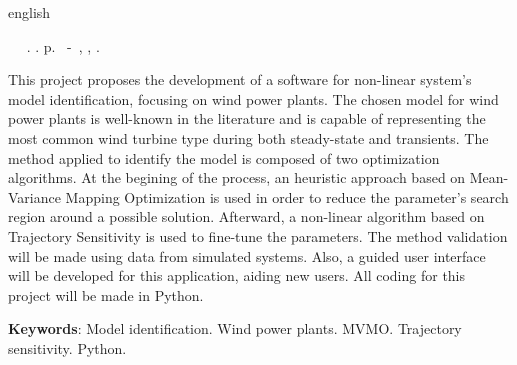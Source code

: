 \begin{resumo}[Abstract]

\begin{otherlanguage*}{english}

\begin{flushleft} 
	\setlength{\absparsep}{0pt} %
	\SingleSpacing 
 	\imprimirautorabr~ ~\textbf{\imprimirtitleabstract}.	\imprimirdata.  \pageref{LastPage}p. 
	\imprimirtipotrabalho~-~\imprimirinstituicao, \imprimirlocal, 	\imprimirdata. 
\end{flushleft}

\OnehalfSpacing

This project proposes the development of a software for non-linear system's model identification, focusing on wind power plants. The chosen model  for wind power plants is well-known in the literature and is capable of representing the most common wind turbine type during both steady-state and transients. The method applied to identify the model is composed of two optimization algorithms. At the begining of the process, an heuristic approach based on Mean-Variance Mapping Optimization is used in order to reduce the parameter's search region around a possible solution. Afterward, a non-linear algorithm based on Trajectory Sensitivity is used to fine-tune the parameters. The method validation will be made using data from simulated systems. Also, a guided user interface will be developed for this application, aiding new users. All coding for this project will be made in Python.


\textbf{Keywords}: Model identification. Wind power plants. MVMO. Trajectory sensitivity. Python.

\end{otherlanguage*}

\end{resumo}

